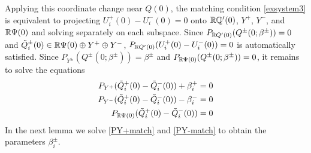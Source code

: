\documentclass[10pt,reqno]{amsart}
\theoremstyle{plain}
\theoremstyle{definition}
\theoremstyle{remark}
\numberwithin{theorem}{section}
\numberwithin{equation}{section}
\begin{document}
Applying this coordinate change near $Q(0)$, the matching condition \cref{exsystem3} is equivalent to projecting $U_i^+(0) - U_i^-(0) = 0$ onto $\mathbb{R} \mathbb{Q}'(0)$, $Y^+$, $Y^-$, and $\mathbb{R} \Psi(0)$ and solving separately on each subspace. Since $P_{\mathbb{R} Q'(0)}(Q^\pm(0; \beta^\pm)) = 0$ and $\tilde{Q}_i^\pm(0) \in \mathbb{R} \Psi(0) \oplus Y^+ \oplus Y^-$, $P_{\mathbb{R} Q'(0)}(U_i^+(0) - U_i^-(0)) = 0$ is automatically satisfied. Since $P_{Y^\pm}(Q^\pm(0; \beta^\pm)) = \beta^\pm$ and $P_{\mathbb{R} \Psi(0)}(Q^\pm(0; \beta^\pm)) = 0$, it remains to solve the equations
\begin{align}
P_{Y^+}(\tilde{Q}_i^+(0) - \tilde{Q}_i^-(0)) + \beta_i^+  &= 0 \label{PY+match} \\
P_{Y^-}(\tilde{Q}_i^+(0) - \tilde{Q}_i^-(0)) - \beta_i^- &= 0 \label{PY-match} \\
P_{\mathbb{R} \Psi(0)}(\tilde{Q}_i^+(0) - \tilde{Q}_i^-(0)) &= 0 \label{PZmatch}
\end{align}
In the next lemma we solve \cref{PY+match} and \cref{PY-match} to obtain the parameters $\beta_i^\pm$.
\end{document}
